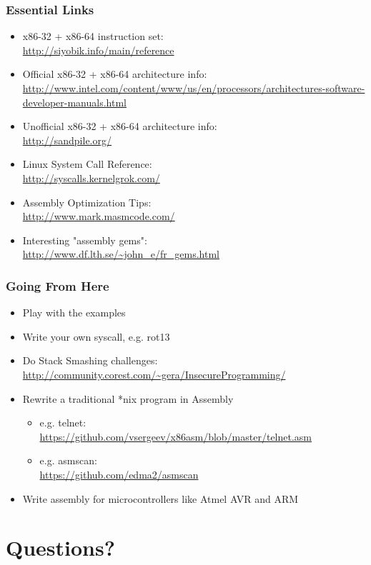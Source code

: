 \documentclass[11pt,xcolor=dvipsnames]{beamer}
\begin{document}
\begin{frame}[fragile,t]
\frametitle{Essential Links}
\begin{itemize}
  \item x86-32 + x86-64 instruction set: \\ \url{http://siyobik.info/main/reference}
  \item Official x86-32 + x86-64 architecture info: \\ \url{http://www.intel.com/content/www/us/en/processors/architectures-software-developer-manuals.html}
  \item Unofficial x86-32 + x86-64 architecture info: \\ \url{http://sandpile.org/}
  \item Linux System Call Reference: \\ \url{http://syscalls.kernelgrok.com/}
  \item Assembly Optimization Tips: \\ \url{http://www.mark.masmcode.com/}
  \item Interesting "assembly gems": \\ \url{http://www.df.lth.se/~john\_e/fr\_gems.html}
\end{itemize}
\end{frame}

\begin{frame}[fragile,t]
\frametitle{Going From Here}
\begin{itemize}
  \item Play with the examples
  \item Write your own syscall, e.g. rot13
  \item Do Stack Smashing challenges: \\ {\footnotesize \url{http://community.corest.com/~gera/InsecureProgramming/}}
  \item Rewrite a traditional *nix program in Assembly
\begin{itemize}
  \item e.g. telnet: \\ {\footnotesize \url{https://github.com/vsergeev/x86asm/blob/master/telnet.asm}}
  \item e.g. asmscan: \\ {\footnotesize\url{https://github.com/edma2/asmscan}}
\end{itemize}
  \item Write assembly for microcontrollers like Atmel AVR and ARM
\end{itemize}
\end{frame}

\section*{Questions?}
\end{document}
